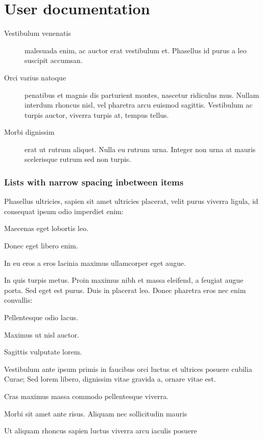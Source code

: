 \chapter{User documentation}
\label{ch:user}


\begin{description}
	\item[Vestibulum venenatis] malesuada enim, ac auctor erat vestibulum et. Phasellus id purus a leo suscipit accumsan.
	\item[Orci varius natoque] penatibus et magnis dis parturient montes, nascetur ridiculus mus. Nullam interdum rhoncus nisl, vel pharetra arcu euismod sagittis. Vestibulum ac turpis auctor, viverra turpis at, tempus tellus.
	\item[Morbi dignissim] erat ut rutrum aliquet. Nulla eu rutrum urna. Integer non urna at mauris scelerisque rutrum sed non turpis.
\end{description}

\subsection{Lists with narrow spacing inbetween items}

Phasellus ultricies, sapien sit amet ultricies placerat, velit purus viverra ligula, id consequat ipsum odio imperdiet enim:
\begin{compactenum}
	\item Maecenas eget lobortis leo.
	\item Donec eget libero enim.
	\item In eu eros a eros lacinia maximus ullamcorper eget augue.
\end{compactenum}

\bigskip

In quis turpis metus. Proin maximus nibh et massa eleifend, a feugiat augue porta. Sed eget est purus. Duis in placerat leo. Donec pharetra eros nec enim convallis:
\begin{compactitem}
	\item Pellentesque odio lacus.
	\item Maximus ut nisl auctor.
	\item Sagittis vulputate lorem.
\end{compactitem}

\bigskip

Vestibulum ante ipsum primis in faucibus orci luctus et ultrices posuere cubilia Curae; Sed lorem libero, dignissim vitae gravida a, ornare vitae est.
\begin{compactdesc}
	\item[Cras maximus] massa commodo pellentesque viverra.
	\item[Morbi sit] amet ante risus. Aliquam nec sollicitudin mauris
	\item[Ut aliquam rhoncus sapien] luctus viverra arcu iaculis posuere
\end{compactdesc}


